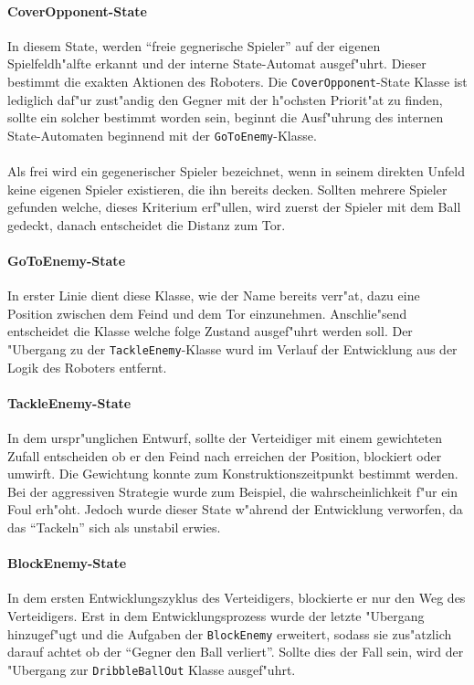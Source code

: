 \paragraph{CoverOpponent-State}
In diesem State, werden ``freie gegnerische Spieler'' auf der eigenen Spielfeldh"alfte erkannt und der interne State-Automat ausgef"uhrt. Dieser bestimmt die exakten Aktionen des Roboters. Die \lstinline{CoverOpponent}-State Klasse ist lediglich daf"ur zust"andig den Gegner mit der h"ochsten Priorit"at zu finden, sollte ein solcher bestimmt worden sein, beginnt die Ausf"uhrung des internen State-Automaten beginnend mit der \lstinline{GoToEnemy}-Klasse.\\
\\
Als frei wird ein gegenerischer Spieler bezeichnet, wenn in seinem direkten Unfeld keine eigenen Spieler existieren, die ihn bereits decken. Sollten mehrere Spieler gefunden welche, dieses Kriterium erf"ullen, wird zuerst der Spieler mit dem Ball gedeckt, danach entscheidet die Distanz zum Tor.

\paragraph{GoToEnemy-State}
In erster Linie dient diese Klasse, wie der Name bereits verr"at, dazu eine Position zwischen dem Feind und dem Tor einzunehmen. Anschlie"send entscheidet die Klasse welche folge Zustand ausgef"uhrt werden soll. Der "Ubergang zu der \lstinline{TackleEnemy}-Klasse wurd im Verlauf der Entwicklung aus der Logik des Roboters entfernt.

\paragraph{TackleEnemy-State}
In dem urspr"unglichen Entwurf, sollte der Verteidiger mit einem gewichteten Zufall entscheiden ob er den Feind nach erreichen der Position, blockiert oder umwirft. Die Gewichtung konnte zum Konstruktionszeitpunkt bestimmt werden. Bei der aggressiven Strategie wurde zum Beispiel, die wahrscheinlichkeit f"ur ein Foul erh"oht. Jedoch wurde dieser State w"ahrend der Entwicklung verworfen, da das ``Tackeln'' sich als unstabil erwies.

\paragraph{BlockEnemy-State}
In dem ersten Entwicklungszyklus des Verteidigers, blockierte er nur den Weg des Verteidigers. Erst in dem Entwicklungsprozess wurde der letzte "Ubergang hinzugef"ugt und die Aufgaben der \lstinline{BlockEnemy} erweitert, sodass sie zus"atzlich darauf achtet ob der ``Gegner den Ball verliert''. Sollte dies der Fall sein, wird der "Ubergang zur \lstinline{DribbleBallOut} Klasse ausgef"uhrt.

